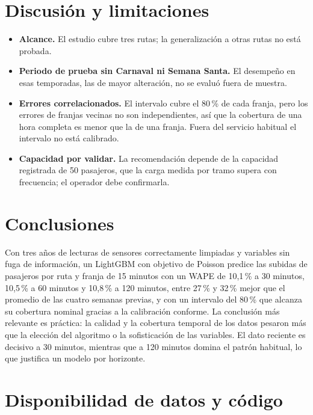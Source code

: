 \documentclass[11pt,a4paper]{article}
\begin{document}
\section{Discusión y limitaciones}

\begin{itemize}
  \item \textbf{Alcance.} El estudio cubre tres rutas; la generalización a otras rutas no está probada.
  \item \textbf{Periodo de prueba sin Carnaval ni Semana Santa.} El desempeño en esas temporadas, las de mayor alteración, no se evaluó fuera de muestra.
  \item \textbf{Errores correlacionados.} El intervalo cubre el 80\,\% de cada franja, pero los errores de franjas vecinas no son independientes, así que la cobertura de una hora completa es menor que la de una franja. Fuera del servicio habitual el intervalo no está calibrado.
  \item \textbf{Capacidad por validar.} La recomendación depende de la capacidad registrada de 50 pasajeros, que la carga medida por tramo supera con frecuencia; el operador debe confirmarla.
\end{itemize}

\section{Conclusiones}

Con tres años de lecturas de sensores correctamente limpiadas y variables sin fuga de información, un LightGBM con objetivo de Poisson predice las subidas de pasajeros por ruta y franja de 15 minutos con un WAPE de 10,1\,\% a 30 minutos, 10,5\,\% a 60 minutos y 10,8\,\% a 120 minutos, entre 27\,\% y 32\,\% mejor que el promedio de las cuatro semanas previas, y con un intervalo del 80\,\% que alcanza su cobertura nominal gracias a la calibración conforme. La conclusión más relevante es práctica: la calidad y la cobertura temporal de los datos pesaron más que la elección del algoritmo o la sofisticación de las variables. El dato reciente es decisivo a 30 minutos, mientras que a 120 minutos domina el patrón habitual, lo que justifica un modelo por horizonte.

\section*{Disponibilidad de datos y código}
\end{document}
